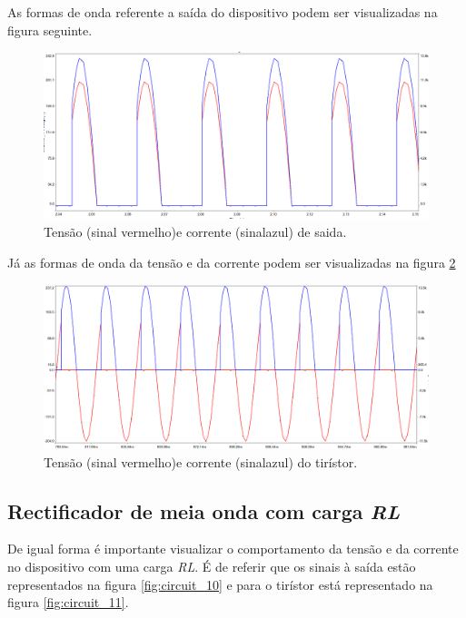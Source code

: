 \documentclass[a4paper,11pt]{article}
\numberwithin{equation}{section}
\begin{document}
As formas de onda referente a saída do dispositivo podem ser visualizadas na figura seguinte.

\begin{figure}[h]
	\centering
	\includegraphics[keepaspectratio=true, scale=0.3]{img/circuito6}
	\caption{Tensão (sinal vermelho)e corrente (sinalazul) de saida.}
	\label{fig:circuit_8}
	\vspace{-0.8em}
\end{figure}

Já as formas de onda da tensão e da corrente podem ser visualizadas na figura  \ref{fig:circuit_9}

\begin{figure}[h]
	\centering
	\includegraphics[keepaspectratio=true, scale=0.3]{img/circuito7}
	\caption{Tensão (sinal vermelho)e corrente (sinalazul) do tirístor.}
	\label{fig:circuit_9}
	\vspace{-0.8em}
\end{figure}

\pagebreak
\subsection{Rectificador de meia onda com carga \textit{RL}}

De igual forma é importante visualizar o comportamento da tensão e da corrente no dispositivo com uma carga \textit{RL}. É de referir que os sinais à saída estão representados na figura \ref{fig:circuit_10} e para o tirístor está representado na figura \ref{fig:circuit_11}.
\end{document}
